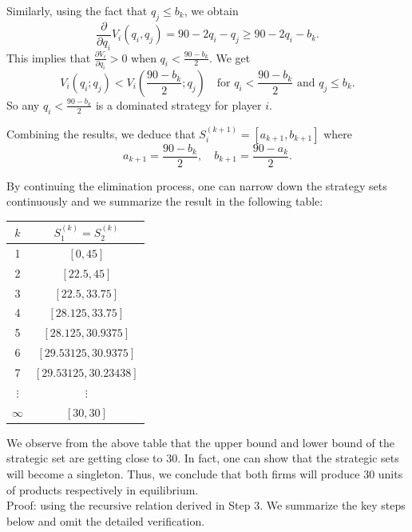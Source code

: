 \documentclass[twoside]{article}
\theoremstyle{definitionstyle}
\begin{document}
Similarly, using the fact that $q_j \leq b_k$, we obtain
\[
\frac{\partial}{\partial q_i} V_i(q_i, q_j) = 90 - 2q_i - q_j \geq 90 - 2q_i - b_k.
\]
This implies that $\frac{\partial V_i}{\partial q_i} > 0$ when $q_i < \frac{90-b_k}{2}$. We get
\[
V_i(q_i; q_j) < V_i\left(\frac{90 - b_k}{2}; q_j\right) \quad \text{for } q_i < \frac{90 - b_k}{2} \text{ and } q_j \leq b_k.
\]
So any $q_i < \frac{90-b_k}{2}$ is a dominated strategy for player $i$.

Combining the results, we deduce that $S_i^{(k+1)} = [a_{k+1}, b_{k+1}]$ where
\[
a_{k+1} = \frac{90 - b_k}{2}, \quad b_{k+1} = \frac{90 - a_k}{2}.
\]

By continuing the elimination process, one can narrow down the strategy sets continuously and we summarize the result in the following table:
\begin{center}
\begin{tabular}{c|c}
$k$ & $S_1^{(k)} = S_2^{(k)}$ \\
\hline
1 & $[0, 45]$ \\
2 & $[22.5, 45]$ \\
3 & $[22.5, 33.75]$ \\
4 & $[28.125, 33.75]$ \\
5 & $[28.125, 30.9375]$ \\
6 & $[29.53125, 30.9375]$ \\
7 & $[29.53125, 30.23438]$ \\
$\vdots$ & $\vdots$ \\
$\infty$ & $[30, 30]$ \\
\end{tabular}
\end{center}

We observe from the above table that the upper bound and lower bound of the strategic set are getting close to 30. In fact, one can show that the strategic sets will become a singleton. Thus, we conclude that both firms will produce 30 units of products respectively in equilibrium.\\
Proof: using the recursive relation derived in Step 3. We summarize the key steps below and omit the detailed verification.
\end{document}
